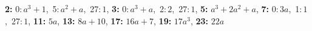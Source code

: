 \textsf{\bfseries 2:} 0:\,$a^3 + 1$,\ 5:\,$a^2 + a$,\ 27:\,$1$, \textsf{\bfseries 3:} 0:\,$a^3 + a$,\ 2:\,$2$,\ 27:\,$1$, \textsf{\bfseries 5:} $a^3 + 2a^2 + a$, \textsf{\bfseries 7:} 0:\,$3a$,\ 1:\,$1$,\ 27:\,$1$, \textsf{\bfseries 11:} $5a$, \textsf{\bfseries 13:} $8a + 10$, \textsf{\bfseries 17:} $16a + 7$, \textsf{\bfseries 19:} $17a^3$, \textsf{\bfseries 23:} $22a$